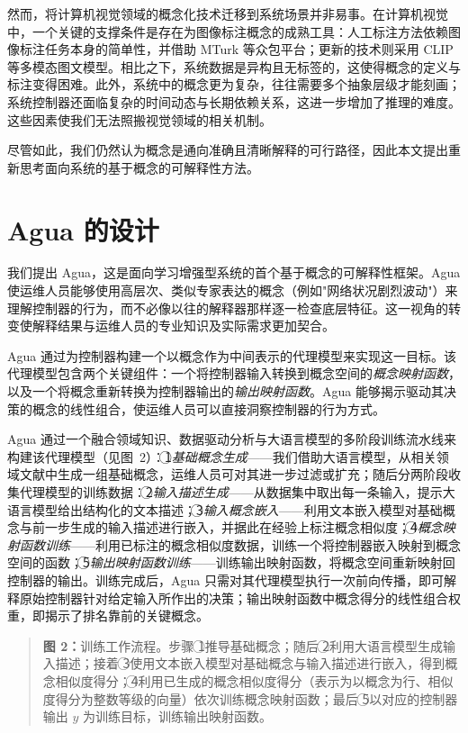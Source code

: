 \documentclass[11pt,a4paper]{article}
\begin{document}
然而，将计算机视觉领域的概念化技术迁移到系统场景并非易事。在计算机视觉中，一个关键的支撑条件是存在为图像标注概念的成熟工具：人工标注方法依赖图像标注任务本身的简单性，并借助 MTurk 等众包平台；更新的技术则采用 CLIP 等多模态图文模型。相比之下，系统数据是异构且无标签的，这使得概念的定义与标注变得困难。此外，系统中的概念更为复杂，往往需要多个抽象层级才能刻画；系统控制器还面临复杂的时间动态与长期依赖关系，这进一步增加了推理的难度。这些因素使我们无法照搬视觉领域的相关机制。

尽管如此，我们仍然认为概念是通向准确且清晰解释的可行路径，因此本文提出重新思考面向系统的基于概念的可解释性方法。

\section{Agua 的设计}

我们提出 Agua，这是面向学习增强型系统的首个基于概念的可解释性框架。Agua 使运维人员能够使用高层次、类似专家表达的概念（例如"网络状况剧烈波动"）来理解控制器的行为，而不必像以往的解释器那样逐一检查底层特征。这一视角的转变使解释结果与运维人员的专业知识及实际需求更加契合。

Agua 通过为控制器构建一个以概念作为中间表示的代理模型来实现这一目标。该代理模型包含两个关键组件：一个将控制器输入转换到概念空间的\emph{概念映射函数}，以及一个将概念重新转换为控制器输出的\emph{输出映射函数}。Agua 能够揭示驱动其决策的概念的线性组合，使运维人员可以直接洞察控制器的行为方式。

Agua 通过一个融合领域知识、数据驱动分析与大语言模型的多阶段训练流水线来构建该代理模型（见图~2）：\textcircled{1}\emph{基础概念生成}——我们借助大语言模型，从相关领域文献中生成一组基础概念，运维人员可对其进一步过滤或扩充；随后分两阶段收集代理模型的训练数据：\textcircled{2}\emph{输入描述生成}——从数据集中取出每一条输入，提示大语言模型给出结构化的文本描述；\textcircled{3}\emph{输入概念嵌入}——利用文本嵌入模型对基础概念与前一步生成的输入描述进行嵌入，并据此在经验上标注概念相似度；\textcircled{4}\emph{概念映射函数训练}——利用已标注的概念相似度数据，训练一个将控制器嵌入映射到概念空间的函数；\textcircled{5}\emph{输出映射函数训练}——训练输出映射函数，将概念空间重新映射回控制器的输出。训练完成后，Agua 只需对其代理模型执行一次前向传播，即可解释原始控制器针对给定输入所作出的决策；输出映射函数中概念得分的线性组合权重，即揭示了排名靠前的关键概念。

\begin{quote}\small\noindent\textbf{图 2：}训练工作流程。步骤 \textcircled{1}推导基础概念；随后 \textcircled{2}利用大语言模型生成输入描述；接着 \textcircled{3}使用文本嵌入模型对基础概念与输入描述进行嵌入，得到概念相似度得分；\textcircled{4}利用已生成的概念相似度得分（表示为以概念为行、相似度得分为整数等级的向量）依次训练概念映射函数；最后 \textcircled{5}以对应的控制器输出 $y$ 为训练目标，训练输出映射函数。\end{quote}
\end{document}
